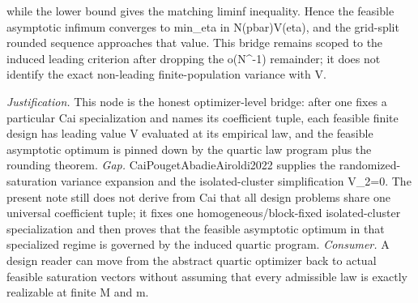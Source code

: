 \documentclass{article}
\begin{document}
while the lower bound gives the matching liminf inequality. Hence the feasible asymptotic infimum converges to min_{eta in N(pbar)}V(eta), and the grid-split rounded sequence approaches that value. This bridge remains scoped to the induced leading criterion after dropping the o(N^{-1}) remainder; it does not identify the exact non-leading finite-population variance with V.
\par\smallskip\noindent \textit{Justification.} This node is the honest optimizer-level bridge: after one fixes a particular Cai specialization and names its coefficient tuple, each feasible finite design has leading value V evaluated at its empirical law, and the feasible asymptotic optimum is pinned down by the quartic law program plus the rounding theorem. \textit{Gap.} CaiPougetAbadieAiroldi2022 supplies the randomized-saturation variance expansion and the isolated-cluster simplification V_2=0. The present note still does not derive from Cai that all design problems share one universal coefficient tuple; it fixes one homogeneous/block-fixed isolated-cluster specialization and then proves that the feasible asymptotic optimum in that specialized regime is governed by the induced quartic program. \textit{Consumer.} A design reader can move from the abstract quartic optimizer back to actual feasible saturation vectors without assuming that every admissible law is exactly realizable at finite M and m.
\end{document}
